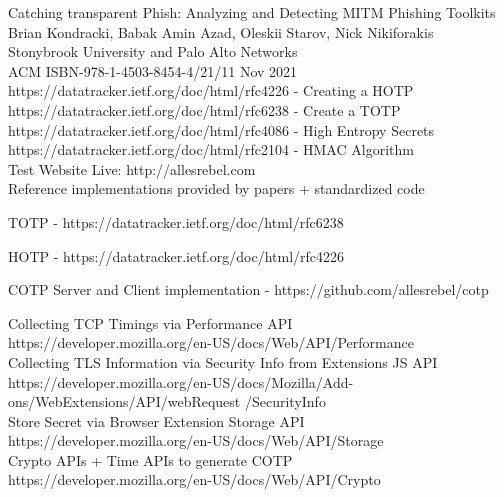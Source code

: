 \documentclass[a4paper, 11pt]{article} 				%
\begin{document}
\noindent
[1]Catching transparent Phish: Analyzing and Detecting MITM Phishing Toolkits\\
\noindent 
Brian Kondracki, Babak Amin Azad, Oleskii Starov, Nick Nikiforakis\\
Stonybrook University and Palo Alto Networks\\ 
\noindent
ACM ISBN-978-1-4503-8454-4/21/11 Nov 2021\\

\noindent
[2]https://datatracker.ietf.org/doc/html/rfc4226 - Creating a HOTP\\

\noindent
[3]https://datatracker.ietf.org/doc/html/rfc6238 - Create a TOTP\\ 

\noindent
[4]https://datatracker.ietf.org/doc/html/rfc4086 - High Entropy Secrets\\

\noindent
[5]https://datatracker.ietf.org/doc/html/rfc2104 - HMAC Algorithm\\

\noindent
[6]Test Website Live: http://allesrebel.com\\ 

\noindent
Reference implementations provided by papers + standardized code

\noindent
[7]TOTP - https://datatracker.ietf.org/doc/html/rfc6238

\noindent
[8]HOTP - https://datatracker.ietf.org/doc/html/rfc4226 

\noindent
[9]COTP Server and Client implementation - https://github.com/allesrebel/cotp

\noindent
[10]Collecting TCP Timings via Performance API\\
https://developer.mozilla.org/en-US/docs/Web/API/Performance\\

\noindent
[11]Collecting TLS Information via Security Info from Extensions JS API\\
https://developer.mozilla.org/en-US/docs/Mozilla/Add-ons/WebExtensions/API/webRequest /SecurityInfo\\

\noindent
[12]Store Secret via Browser Extension Storage API\\
https://developer.mozilla.org/en-US/docs/Web/API/Storage\\

\noindent
[13]Crypto APIs + Time APIs to generate COTP\\
https://developer.mozilla.org/en-US/docs/Web/API/Crypto\\
\end{document}
